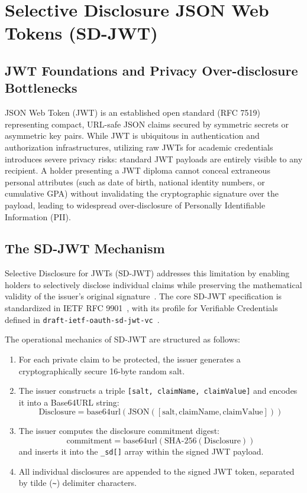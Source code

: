 \section{Selective Disclosure JSON Web Tokens (SD-JWT)}

\subsection{JWT Foundations and Privacy Over-disclosure Bottlenecks}

JSON Web Token (JWT) is an established open standard (RFC 7519) representing compact, URL-safe JSON claims secured by symmetric secrets or asymmetric key pairs. While JWT is ubiquitous in authentication and authorization infrastructures, utilizing raw JWTs for academic credentials introduces severe privacy risks: standard JWT payloads are entirely visible to any recipient. A holder presenting a JWT diploma cannot conceal extraneous personal attributes (such as date of birth, national identity numbers, or cumulative GPA) without invalidating the cryptographic signature over the payload, leading to widespread over-disclosure of Personally Identifiable Information (PII).

\subsection{The SD-JWT Mechanism}

Selective Disclosure for JWTs (SD-JWT) addresses this limitation by enabling holders to selectively disclose individual claims while preserving the mathematical validity of the issuer's original signature~\cite{RFC9901}. The core SD-JWT specification is standardized in IETF RFC 9901~\cite{RFC9901}, with its profile for Verifiable Credentials defined in \texttt{draft-ietf-oauth-sd-jwt-vc}~\cite{SDJWTVC}.

The operational mechanics of SD-JWT are structured as follows:
\begin{enumerate}
    \item For each private claim to be protected, the issuer generates a cryptographically secure 16-byte random salt.
    \item The issuer constructs a triple \texttt{[salt, claimName, claimValue]} and encodes it into a Base64URL string:
    \begin{equation}
    \text{Disclosure} = \text{base64url}(\text{JSON}([\text{salt}, \text{claimName}, \text{claimValue}]))
    \end{equation}
    \item The issuer computes the disclosure commitment digest:
    \begin{equation}
    \text{commitment} = \text{base64url}(\text{SHA-256}(\text{Disclosure}))
    \end{equation}
    and inserts it into the \texttt{\_sd[]} array within the signed JWT payload.
    \item All individual disclosures are appended to the signed JWT token, separated by tilde (\texttt{\textasciitilde{}}) delimiter characters.
\end{enumerate}

